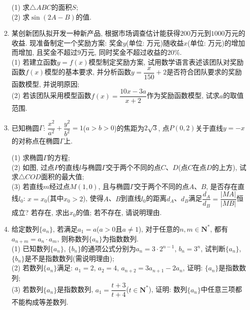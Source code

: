\documentclass[10pt,a4paper]{article}
\begin{document}
\begin{enumerate}[1.]
(1) 求$\triangle ABC$的面积$S$;\\
(2) 求$\sin (2A-B)$的值.
\item 某创新团队拟开发一种新产品, 根据市场调查估计能获得$200$万元到$1000$万元的收益. 现准备制定一个奖励方案: 奖金$y$(单位: 万元)随收益$x$(单位: 万元)的增加而增加, 且奖金不超过$9$万元, 同时奖金不超过收益的$20\%$.\\
(1) 若建立函数$y=f(x)$模型制定奖励方案, 试用数学语言表述该团队对奖励函数$f(x)$模型的基本要求, 并分析函数$y=\dfrac x{150}+2$是否符合团队要求的奖励函数模型, 并说明原因;\\
(2) 若该团队采用模型函数$f(x)=\dfrac{10x-3a}{x+2}$作为奖励函数模型, 试求$a$的取值范围.
\item 已知椭圆$\Gamma$: $\dfrac{x^2}{a^2}+\dfrac{y^2}{b^2}=1$($a>b>0$)的焦距为$2\sqrt 3$, 点$P(0, 2)$关于直线$y=-x$的对称点在椭圆$\Gamma$上.
\begin{center}
\end{center}
(1) 求椭圆$\Gamma$的方程;\\
(2) 如图, 过点$P$的直线$l$与椭圆$\Gamma$交于两个不同的点$C$、$D$(点$C$在点$D$的上方), 试求$\triangle COD$面积的最大值;\\
(3) 若直线$m$经过点$M(1, 0)$, 且与椭圆$\Gamma$交于两个不同的点$A$、$B$, 是否存在直线$l_0$: $x=x_0$(其中$x_0>2$), 使得$A$、$B$到直线$l_0$的距离$d_A$、$d_B$满足$\dfrac{d_A}{d_B}=\dfrac{|MA|}{|MB|}$恒成立? 若存在, 求出$x_0$的值; 若不存在, 请说明理由.
\item 给定数列$\{a_n\}$, 若满足$a_1=a$($a>0$且$a\ne 1$), 对于任意的$n, m\in \mathbf{N}^*$, 都有$a_{n+m}=a_n\cdot a_m$, 则称数列$\{a_n\}$为指数数列.\\
(1) 已知数列$\{a_n\}$, $\{b_n\}$的通项公式分别为$a_n=3\cdot 2^{n-1}$, $b_n=3^n$, 试判断$\{a_n\}$, $\{b_n\}$是不是指数数列(需说明理由);\\
(2) 若数列$\{a_n\}$满足: $a_1=2$, $a_2=4$, $a_{n+2}=3a_{n+1}-2a_n$, 证明: $\{a_n\}$是指数数列;\\
(3) 若数列$\{a_n\}$是指数数列, $a_1=\dfrac{t+3}{t+4}$($t\in \mathbf{N}^*$), 证明: 数列$\{a_n\}$中任意三项都不能构成等差数列.


\end{enumerate}
\end{document}
